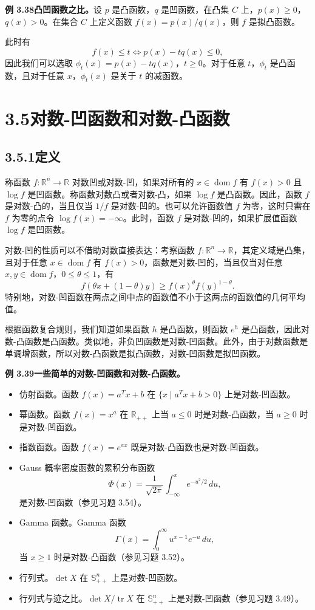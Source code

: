 \documentclass[UTF8, 12pt, fontset=fandol, oneside]{ctexart}
\DeclareMathOperator{\dom}{dom}
\begin{document}
\noindent\textbf{例 3.38\quad 凸凹函数之比。}\quad 设 $p$ 是凸函数，$q$ 是凹函数，在凸集 $C$ 上，$p(x)\geq0$，$q(x)>0$。在集合 $C$ 上定义函数 $f(x)=p(x)/q(x)$，则 $f$ 是拟凸函数。

此时有
\[
f(x)\leq t\Longleftrightarrow p(x)-tq(x)\leq0,
\]
因此我们可以选取 $\phi_t(x)=p(x)-tq(x)$，$t\geq0$。对于任意 $t$，$\phi_t$ 是凸函数，且对于任意 $x$，$\phi_t(x)$ 是关于 $t$ 的减函数。

\section*{3.5\quad 对数-凹函数和对数-凸函数}

\subsection*{3.5.1\quad 定义}

称函数 $f:\mathbb{R}^n\to\mathbb{R}$ 对数凹或对数-凹，如果对所有的 $x\in\dom f$ 有 $f(x)>0$ 且 $\log f$ 是凹函数。称函数对数凸或者对数-凸，如果 $\log f$ 是凸函数。因此，函数 $f$ 是对数-凸的，当且仅当 $1/f$ 是对数-凹的。也可以允许函数值 $f$ 为零，这时只需在 $f$ 为零的点令 $\log f(x)=-\infty$。此时，函数 $f$ 是对数-凹的，如果扩展值函数 $\log f$ 是凹函数。

对数-凹的性质可以不借助对数直接表达：考察函数 $f:\mathbb{R}^n\to\mathbb{R}$，其定义域是凸集，且对于任意 $x\in\dom f$ 有 $f(x)>0$，函数是对数-凹的，当且仅当对任意 $x,y\in\dom f$，$0\leq\theta\leq1$，有
\[
f(\theta x+(1-\theta)y)\geq f(x)^\theta f(y)^{1-\theta}.
\]
特别地，对数-凹函数在两点之间中点的函数值不小于这两点的函数值的几何平均值。

根据函数复合规则，我们知道如果函数 $h$ 是凸函数，则函数 $e^h$ 是凸函数，因此对数-凸函数是凸函数。类似地，非负凹函数是对数-凹函数。此外，由于对数函数是单调增函数，所以对数-凸函数是拟凸函数，对数-凹函数是拟凹函数。

\noindent\textbf{例 3.39\quad 一些简单的对数-凹函数和对数-凸函数。}
\begin{itemize}
\item 仿射函数。函数 $f(x)=a^Tx+b$ 在 $\{x\mid a^Tx+b>0\}$ 上是对数-凹函数。
\item 幂函数。函数 $f(x)=x^a$ 在 $\mathbb{R}_{++}$ 上当 $a\leq0$ 时是对数-凸函数，当 $a\geq0$ 时是对数-凹函数。
\item 指数函数。函数 $f(x)=e^{ax}$ 既是对数-凸函数也是对数-凹函数。
\item Gauss 概率密度函数的累积分布函数
\[
\Phi(x)=\frac{1}{\sqrt{2\pi}}\int_{-\infty}^x e^{-u^2/2}\,du,
\]
是对数-凹函数（参见习题 3.54）。
\item Gamma 函数。Gamma 函数
\[
\Gamma(x)=\int_0^\infty u^{x-1}e^{-u}\,du,
\]
当 $x\geq1$ 时是对数-凸函数（参见习题 3.52）。
\item 行列式。$\det X$ 在 $\mathbb{S}_{++}^n$ 上是对数-凹函数。
\item 行列式与迹之比。$\det X/\operatorname{tr}X$ 在 $\mathbb{S}_{++}^n$ 上是对数-凹函数（参见习题 3.49）。
\end{itemize}
\end{document}
